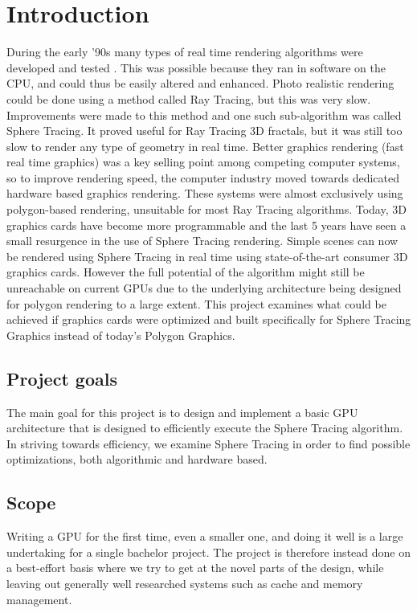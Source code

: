 \chapter{Introduction} 	
	During the early '90s many types of real time rendering algorithms were 
	developed and tested \cite{TODO}. This was possible because they ran in 
	software on the CPU, and could thus be easily altered and enhanced. 
	Photo realistic rendering could be done using a method called Ray Tracing, 
	but this was very slow\cite{TODO}. Improvements were made to this method and 
	one such sub-algorithm was called Sphere Tracing. It proved useful for Ray 
	Tracing 3D fractals\cite{TODO}, but it was still too slow to render any type 
	of geometry in real time\cite{TODO}. Better graphics rendering (fast real 
	time graphics) was a key selling point among competing computer systems, so 
	to improve rendering speed, the computer industry moved towards dedicated 
	hardware based 	graphics rendering\cite{TODO}. These systems were almost 
	exclusively using polygon-based rendering, unsuitable for most Ray Tracing 
	algorithms. Today, 	3D graphics cards have become more programmable and the 
	last 5 years have seen a small resurgence in the use of Sphere Tracing 
	rendering\cite{TODO}. Simple scenes can now be rendered using Sphere Tracing 
	in real time using state-of-the-art consumer 3D graphics cards. However the 
	full potential of the algorithm might still be unreachable on current GPUs 
	due to the underlying architecture being designed for polygon rendering to a 
	large extent\cite{TODO}. This project examines what could be achieved if 
	graphics cards were optimized and built specifically for Sphere Tracing 
	Graphics instead of today’s Polygon Graphics.		 
	
	\section{Project goals}
	
		The main goal for this project is to design and implement a basic GPU 
		architecture that is designed to efficiently execute the Sphere Tracing 
		algorithm. In striving towards efficiency, we examine Sphere Tracing in 
		order to find possible optimizations, both algorithmic and hardware 
		based.
		
	\section{Scope}

		Writing a GPU for the first time, even a smaller one, and doing it well is a large undertaking for a single bachelor project. The project is therefore instead done on a best-effort basis where we try to get at the novel parts of the design, while leaving out generally well researched systems such as cache and memory management. 
